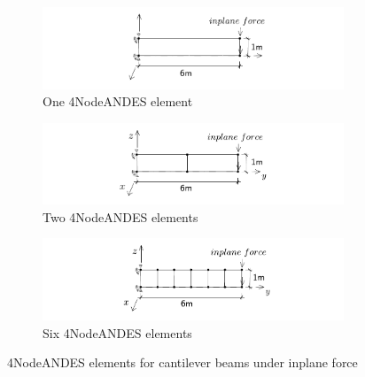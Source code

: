 \documentclass[fleqn,11pt]{article}
\begin{document}
\begin{figure}[H]
  \centering
  \begin{subfigure}{0.5\textwidth}
    \centering
    \includegraphics[width=9cm]{../Figure-files/beam_ANDES_yz_inPlane_1div.pdf}
    \caption{One 4NodeANDES element}
  \end{subfigure}
  \vskip 8pt
  \begin{subfigure}{0.5\textwidth}
    \centering
    \includegraphics[width=9cm]{../Figure-files/beam_ANDES_yz_inPlane_2div.pdf}
    \caption{Two 4NodeANDES elements}
  \end{subfigure}
  \vskip 8pt
  \begin{subfigure}{0.5\textwidth}
    \centering
    \includegraphics[width=9cm]{../Figure-files/beam_ANDES_yz_inPlane_6div.pdf}
    \caption{Six 4NodeANDES elements}
  \end{subfigure}
  \captionsetup{justification=centering,margin=3cm}
  \caption{4NodeANDES elements for cantilever beams under inplane force}
  \label{fig 4NodeANDES elements for cantilever beams under inplane force}
\end{figure}




\end{document}
